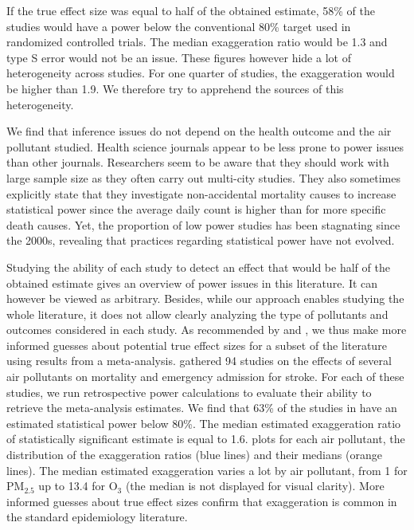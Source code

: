\documentclass[12pt]{article}
\begin{document}
        If the true effect size was equal to half of the obtained estimate, 58\% of the studies would have a power below the conventional 80\% target used in randomized controlled trials. The median exaggeration ratio would be 1.3 and type S error would not be an issue. These figures however hide a lot of heterogeneity across studies. For one quarter of studies, the exaggeration would be higher than 1.9. We therefore try to apprehend the sources of this heterogeneity.
    
        We find that inference issues do not depend on the health outcome and the air pollutant studied. Health science journals appear to be less prone to power issues than other journals. Researchers seem to be aware that they should work with large sample size as they often carry out multi-city studies. They also sometimes explicitly state that they investigate non-accidental mortality causes to increase statistical power since the average daily count is higher than for more specific death causes. Yet, the proportion of low power studies has been stagnating since the 2000s, revealing that practices regarding statistical power have not evolved. 

        Studying the ability of each study to detect an effect that would be half of the obtained estimate gives an overview of power issues in this literature. It can however be viewed as arbitrary. Besides, while our approach enables studying the whole literature, it does not allow clearly analyzing the type of pollutants and outcomes considered in each study. As recommended by \cite{gelman_beyond_2014} and \cite{ioannidis_power_2017}, we thus make more informed guesses about potential true effect sizes for a subset of the literature using results from a meta-analysis. \cite{shah_short_2015} gathered 94 studies on the effects of several air pollutants on mortality and emergency admission for stroke. For each of these studies, we run retrospective power calculations to evaluate their ability to retrieve the meta-analysis estimates. We find that 63\% of the studies in \cite{shah_short_2015} have an estimated statistical power below 80\%. The median estimated exaggeration ratio of statistically significant estimate is equal to 1.6.  plots for each air pollutant, the distribution of the exaggeration ratios (blue lines) and their medians (orange lines). The median estimated exaggeration varies a lot by air pollutant, from 1 for PM$_{2.5}$ up to 13.4 for O$_{3}$ (the median is not displayed for visual clarity). More informed guesses about true effect sizes confirm that exaggeration is common in the standard epidemiology literature.
\end{document}
